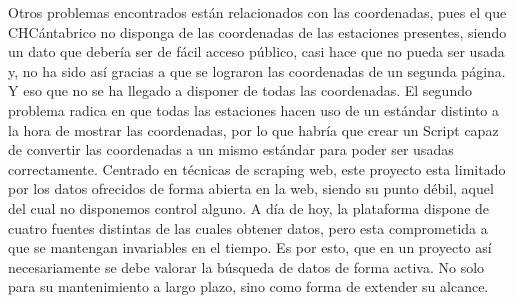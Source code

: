 \newline
Otros problemas encontrados están relacionados con las coordenadas, pues el que CHCántabrico no disponga de las coordenadas de las estaciones presentes, siendo un dato que debería ser de fácil acceso público, casi hace que no pueda ser usada y, no ha sido así gracias a que se lograron las coordenadas de un segunda página. Y eso que no se ha llegado a disponer de todas las coordenadas. El segundo problema radica en que todas las estaciones hacen uso de un estándar distinto a la hora de mostrar las coordenadas, por lo que habría que crear un Script capaz de convertir las coordenadas a un mismo estándar para poder ser usadas correctamente.\newline
\newline
Centrado en técnicas de scraping web, este proyecto esta limitado por los datos ofrecidos de forma abierta en la web, siendo su punto débil, aquel del cual no disponemos control alguno. A día de hoy, la plataforma dispone de cuatro fuentes distintas de las cuales obtener datos, pero esta comprometida a que se mantengan invariables en el tiempo. Es por esto, que en un proyecto así necesariamente se debe valorar la búsqueda de datos de forma activa. No solo para su mantenimiento a largo plazo, sino como forma de extender su alcance.\newline
\newline